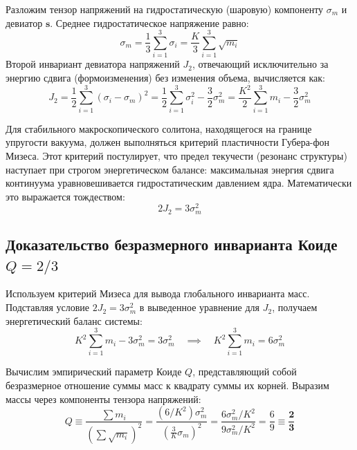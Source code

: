 \documentclass[12pt,a4paper]{article}
\begin{document}
	Разложим тензор напряжений на гидростатическую (шаровую) компоненту $\sigma_m$ и девиатор $\mathbf{s}$. Среднее гидростатическое напряжение равно:
	\begin{equation}
		\sigma_m = \frac{1}{3}\sum_{i=1}^3 \sigma_i = \frac{K}{3} \sum_{i=1}^3 \sqrt{m_i}
	\end{equation}
	Второй инвариант девиатора напряжений $J_2$, отвечающий исключительно за энергию сдвига (формоизменения) без изменения объема, вычисляется как:
	\begin{equation}
		J_2 = \frac{1}{2} \sum_{i=1}^3 (\sigma_i - \sigma_m)^2 = \frac{1}{2} \sum_{i=1}^3 \sigma_i^2 - \frac{3}{2} \sigma_m^2 = \frac{K^2}{2} \sum_{i=1}^3 m_i - \frac{3}{2} \sigma_m^2
	\end{equation}
	
	Для стабильного макроскопического солитона, находящегося на границе упругости вакуума, должен выполняться критерий пластичности Губера-фон Мизеса. Этот критерий постулирует, что предел текучести (резонанс структуры) наступает при строгом энергетическом балансе: максимальная энергия сдвига континуума уравновешивается гидростатическим давлением ядра. Математически это выражается тождеством:
	\begin{equation}
		2 J_2 = 3 \sigma_m^2
	\end{equation}
	
	\subsection{Доказательство безразмерного инварианта Коиде $Q = 2/3$}
	Используем критерий Мизеса для вывода глобального инварианта масс. Подставляя условие $2 J_2 = 3 \sigma_m^2$ в выведенное уравнение для $J_2$, получаем энергетический баланс системы:
	\begin{equation}
		K^2 \sum_{i=1}^3 m_i - 3 \sigma_m^2 = 3 \sigma_m^2 \quad \implies \quad K^2 \sum_{i=1}^3 m_i = 6 \sigma_m^2
	\end{equation}
	
	Вычислим эмпирический параметр Коиде $Q$, представляющий собой безразмерное отношение суммы масс к квадрату суммы их корней. Выразим массы через компоненты тензора напряжений:
	\begin{equation}
		Q \equiv \frac{\sum m_i}{\left( \sum \sqrt{m_i} \right)^2} = \frac{(6 / K^2) \sigma_m^2}{\left( \frac{3}{K} \sigma_m \right)^2} = \frac{6 \sigma_m^2 / K^2}{9 \sigma_m^2 / K^2} = \frac{6}{9} \equiv \mathbf{\frac{2}{3}}
	\end{equation}
	
\end{document}
